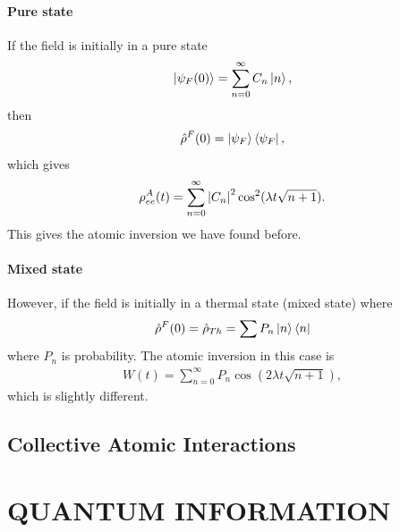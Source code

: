\documentclass{book}
\theoremstyle{definition}
\begin{document}
\subsubsection{Pure state}
If the field is initially in a pure state
\begin{align}
\ket{\psi_F(0)} = \sum^\infty_{n=0}C_n\ket{n},
\end{align}
then
\begin{align}
\hat{\rho}^F(0) = \ket{\psi_F}\bra{\psi_F},
\end{align}
which gives
\begin{align}
\rho^A_{ee}(t) = \sum^\infty_{n=0}\abs{C_n}^2\cos^2(\lambda t \sqrt{n+1}).
\end{align}
This gives the atomic inversion we have found before. 
\subsubsection{Mixed state}
However, if the field is initially in a thermal state (mixed state) where
\begin{align}
\hat{\rho}^F(0) = \hat{\rho}_{Th} = \sum P_n\ket{n}\bra{n}
\end{align}
where $P_n$ is probability. The atomic inversion in this case is
\begin{align}
W(t) = \sum^\infty_{n=0}P_n \cos(2\lambda t\sqrt{n+1}),
\end{align}
which is slightly different. 



















\newpage

\section{Collective Atomic Interactions}



\newpage


\chapter{QUANTUM INFORMATION}

\newpage
\end{document}
